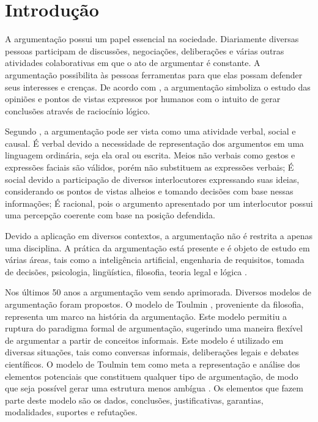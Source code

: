 \chapter{Introdução}

A argumentação possui um papel essencial na sociedade. Diariamente diversas pessoas participam de discussões, negociações, deliberações e várias outras atividades colaborativas em que o ato de argumentar é constante. A argumentação possibilita às pessoas ferramentas para que elas possam defender seus interesses e crenças.  De acordo com \cite{schneider2013Argumentation}, a argumentação simboliza o estudo das opiniões e pontos de vistas expressos por humanos com o intuito de gerar conclusões através de raciocínio lógico.
%

Segundo \cite{eemeren1996argumentation}, a argumentação pode ser vista como uma atividade verbal, social e causal.  É verbal devido a necessidade de representação dos argumentos em uma linguagem ordinária, seja ela oral ou escrita. Meios não verbais como gestos e expressões faciais são válidos, porém não substituem as expressões verbais; É social devido a participação de diversos interlocutores expressando suas ideias, considerando os pontos de vistas alheios e tomando decisões com base nessas informações; É racional, pois o argumento apresentado por um interlocutor possui uma percepção coerente com base na posição defendida.
%

Devido a aplicação em diversos contextos, a argumentação não é restrita a apenas uma disciplina.  A prática da argumentação está presente e é objeto de estudo em várias áreas, tais como a inteligência artificial, engenharia de requisitos, tomada de decisões, psicologia, lingüística, filosofia, teoria legal e lógica \cite{charwat2013abstractargumentation}.
%

Nos últimos 50 anos a argumentação vem sendo aprimorada. Diversos modelos de argumentação foram propostos. O modelo de Toulmin \cite{toulmin1958uses}, proveniente da filosofia, representa um marco na história da argumentação. Este modelo permitiu a ruptura  do paradigma formal de argumentação, sugerindo uma maneira flexível de argumentar a partir de conceitos informais. Este modelo é utilizado em diversas situações, tais como conversas informais, deliberações legais e debates científicos. O modelo de Toulmin tem como meta a representação e análise dos elementos potenciais que constituem qualquer tipo de argumentação, de modo que seja possível gerar uma estrutura menos ambígua \cite{toulmin1958uses}. Os elementos que fazem parte deste modelo são os dados, conclusões, justificativas, garantias, modalidades, suportes e refutações.
%

